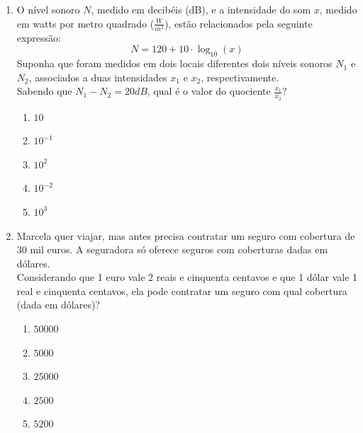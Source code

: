 \documentclass[10pt,a4paper]{article}
\begin{document}
\begin{multicols}{2}
\begin{enumerate}
		\begin{enumerate}
		\item sim, pois 69,8\% dos candidatos s\~ao homens e 30,2\% s\~ao mulheres.
		\item sim, pois 67,8\% dos candidatos s\~ao homens e 33,1\% s\~ao mulheres.
		\item n\~ao, pois 72,1\% dos candidatos s\~ao homens e 27,9\% s\~ao mulheres.
		\item n\~ao, pois 33,1\% dos candidatos s\~ao homens e 67,8\% s\~ao mulheres.
		\item n\~ao, pois 30,2\% dos candidatos s\~ao homens e 69,8\% s\~ao mulheres.
		\end{enumerate}

	\item O n\'ivel sonoro $N$, medido em decib\'eis (dB), e a intensidade do som $x$, medido em watts por metro quadrado ($\frac{W}{m^2}$), est\~ao relacionados pela seguinte express\~ao:
		$$ N = 120 + 10 \cdot \log_{10} (x) $$
	Suponha que foram medidos em dois locais diferentes dois n\'iveis  sonoros $N_1$ e $N_2$, associados a duas intensidades $x_1$ e $x_2$, respectivamente.\\
	Sabendo que $N_1 - N_2 = 20dB$, qual \'e o valor do quociente $\frac{x_1}{x_2}$?
		\begin{enumerate}
		\item $10$
		\item $10^{-1}$
		\item $10^2$
		\item $10^{-2}$
		\item $10^3$
		\end{enumerate}

	\item Marcela quer viajar, mas antes precisa contratar um seguro com cobertura de 30 mil euros. A seguradora s\'o oferece seguros com coberturas dadas em d\'olares.\\
		Considerando que 1 euro vale 2 reais e cinquenta centavos e que 1 d\'olar vale 1 real e cinquenta centavos, ela pode contratar um seguro com qual cobertura (dada em 	d\'olares)?
		\begin{enumerate}
		\item $50000$
		\item $5000$
		\item $25000$
		\item $2500$
		\item $5200$
		\end{enumerate}


\end{enumerate}
\end{multicols}
\end{document}

